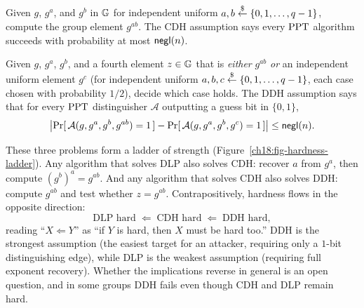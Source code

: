 \begin{definition}
\label{ch18:cdh}
Given $g$, $g^a$, and $g^b$ in $\mathbb{G}$ for independent uniform $a, b \stackrel{\$}{\gets} \{0, 1, \dots, q-1\}$, compute the group element $g^{ab}$. The CDH assumption says every $\mathrm{PPT}$ algorithm succeeds with probability at most $\mathsf{negl}(n)$.
\end{definition}

\begin{definition}
\label{ch18:ddh}
Given $g$, $g^a$, $g^b$, and a fourth element $z \in \mathbb{G}$ that is \emph{either} $g^{ab}$ \emph{or} an independent uniform element $g^c$ (for independent uniform $a, b, c \stackrel{\$}{\gets} \{0, 1, \dots, q-1\}$, each case chosen with probability $1/2$), decide which case holds. The DDH assumption says that for every $\mathrm{PPT}$ distinguisher $\mathcal{A}$ outputting a guess bit in $\{0, 1\}$,
\[
  \bigl|\Pr[\,\mathcal{A}(g, g^a, g^b, g^{ab}) = 1\,] - \Pr[\,\mathcal{A}(g, g^a, g^b, g^c) = 1\,]\bigr| \le \mathsf{negl}(n).
\]
\end{definition}

These three problems form a ladder of strength (Figure~\ref{ch18:fig-hardness-ladder}). Any algorithm that solves DLP also solves CDH: recover $a$ from $g^a$, then compute $(g^b)^a = g^{ab}$. And any algorithm that solves CDH also solves DDH: compute $g^{ab}$ and test whether $z = g^{ab}$. Contrapositively, hardness flows in the opposite direction:
\[
  \text{DLP hard} \;\Longleftarrow\; \text{CDH hard} \;\Longleftarrow\; \text{DDH hard},
\]
reading ``$X \Longleftarrow Y$'' as ``if $Y$ is hard, then $X$ must be hard too.'' DDH is the strongest assumption (the easiest target for an attacker, requiring only a $1$-bit distinguishing edge), while DLP is the weakest assumption (requiring full exponent recovery). Whether the implications reverse in general is an open question, and in some groups DDH fails even though CDH and DLP remain hard.

